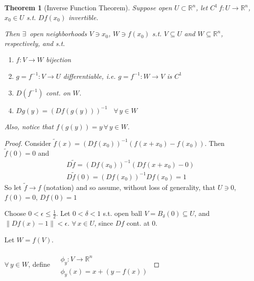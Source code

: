 \documentclass[10pt]{amsart}
\newtheorem{theorem}{Theorem}
\begin{document}
\begin{multicols*}{2}
\begin{theorem}[Inverse Function Theorem]
  Suppose open $U \subset \mathbb{R}^n$, let $C^1 \, f: U \to \mathbb{R}^n$, $x_0 \in U$ s.t. $Df(x_0)$ invertible.  


Then $\exists \,$ open neighborhoods $V\ni x_0$, $W \ni f(x_0)$ s.t. $V\subseteq U$ and $W\subseteq \mathbb{R}^n$, respectively, and s.t.

\begin{enumerate}
\item[(i)] $f: V\to W$ bijection
\item[(ii)] $g = f^{-1}:V \to U$ differentiable, i.e. $g = f^{-1}:W\to V$ is $C^1$
\item[(iii)] $D(f^{-1}) $ cont. on $W$.  
\item[(iv)] $Dg(y) = (Df(g(y)))^{-1}$ \, $\forall \, y \in W$
\end{enumerate}
Also, notice that $f(g(y)) = y \, \forall \, y \in W$.  
\end{theorem}

\begin{proof}

Consider $\widetilde{f}(x) = (Df(x_0))^{-1}(f(x+x_0) - f(x_0))$.  Then \\
\phantom{Consider} $\widetilde{f}(0) = 0$ and 
\[
\begin{aligned}
  &  D\widetilde{f}= (Df(x_0))^{-1}(Df(x+x_0) -0)  \\
  & D\widetilde{f}(0) = (Df(x_0))^{-1}Df(x_0)=1
\end{aligned}
\]  
So let $\widetilde{f}\to f$ (notation) and so assume, without loss of generality, that $U\ni 0$, $f(0)=0$, $Df(0)=1$

Choose $0 < \epsilon \leq \frac{1}{2}$.  Let $0< \delta <1$ s.t. open ball $V = B_{\delta}(0) \subseteq U$, and $\| Df(x)-1\| < \epsilon$.  $\forall \, x \in U$, since $Df$ cont. at $0$.  

Let $W=f(V)$.  

$\forall \, y \in W$, define $\begin{aligned} & \quad \\
  & \phi_y : V \to \mathbb{R}^n \\
  & \phi_y(x) = x + (y-f(x))\end{aligned}$


\end{proof}
\end{multicols*}
\end{document}
